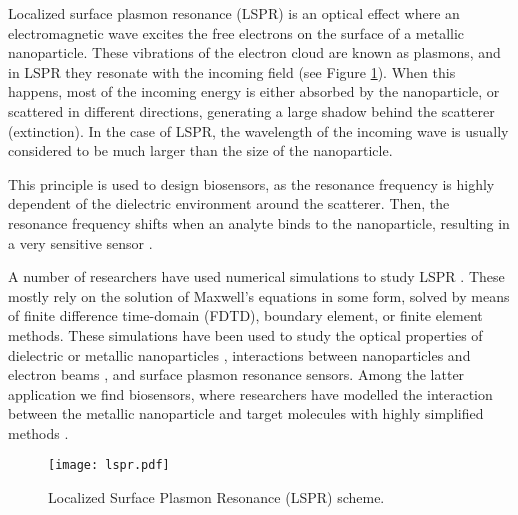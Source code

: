 Localized surface plasmon resonance (LSPR) is an optical effect where an 
electromagnetic wave excites the free electrons on the surface of a metallic nanoparticle.
These vibrations of the electron cloud are known as plasmons, and in LSPR they resonate with the incoming
field (see Figure \ref{fig:lspr}). When this happens, most of the incoming energy
is either absorbed by the nanoparticle, or scattered in different directions,
generating a large shadow behind the scatterer (extinction). In the case of LSPR,
the wavelength of the incoming wave is usually considered to be much larger than 
the size of the nanoparticle.

This principle is used to design 
biosensors, as the resonance frequency is highly dependent of the dielectric environment 
around the scatterer. 
Then, the resonance frequency shifts when an analyte binds to the nanoparticle, 
resulting in a very sensitive sensor \cite{HaesETal2004, HaesVanduyne2002}.

A number of researchers have used numerical simulations to study LSPR \cite{SolisTaboadaObelleiroLiz-MaarzanGarciadeabajo2014}. These mostly rely on the 
solution of Maxwell's equations in some form, solved by means of finite difference time-domain (FDTD),
boundary element, or finite element methods. 
These simulations have been used to study the 
optical properties of dielectric or metallic nanoparticles \cite{Hohenester2018,HohenesterTrugler2012,
JungPedersenSondergaardPedersenLarsenNielsen2010, VideenSun2003,
MayergoyzFredkinZhang2005, MayergoyzZhang2007}, interactions between nanoparticles
and electron beams \cite{GarciadeabajoAizpurua1997, GarciadeabajoHowie2002},
and surface plasmon resonance sensors.
Among the latter application we find biosensors, where researchers have modelled the 
interaction between the metallic nanoparticle and target molecules with highly 
simplified methods \cite{JungCampbellChinowskyMarYee1998,HaesVanduyne2002,DavisGomezVernon2010,AntosiewiczApellClaudioKall2011}.

\begin{figure}[h] %
   \centering
   \texttt{[image: lspr.pdf]} 
   \caption{Localized Surface Plasmon Resonance (LSPR) scheme. }
   \label{fig:lspr}
\end{figure}


